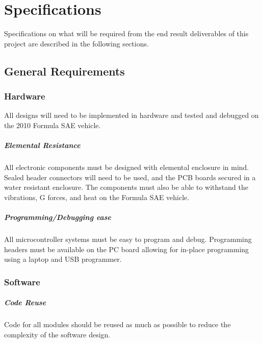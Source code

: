 %
%
%
%

\chapter{Specifications}

Specifications on what will be required from the end result deliverables of this project are described in the following sections.

\section{General Requirements}

\subsection{Hardware}
All designs will need to be implemented in hardware and tested and debugged on the 2010 Formula SAE vehicle.

\paragraph{Elemental Resistance}
All electronic components must be designed with elemental enclosure in mind. Sealed header connectors will need to be used, and the PCB boards secured in a water resistant enclosure. The components must also be able to withstand the vibrations, G forces, and heat on the Formula SAE vehicle.

\paragraph{Programming/Debugging ease}
All microcontroller systems must be easy to program and debug. Programming headers must be available on the PC board allowing for in-place programming using a laptop and USB programmer.

\subsection{Software}

\paragraph{Code Reuse}
Code for all modules should be reused as much as possible to reduce the complexity of the software design.

